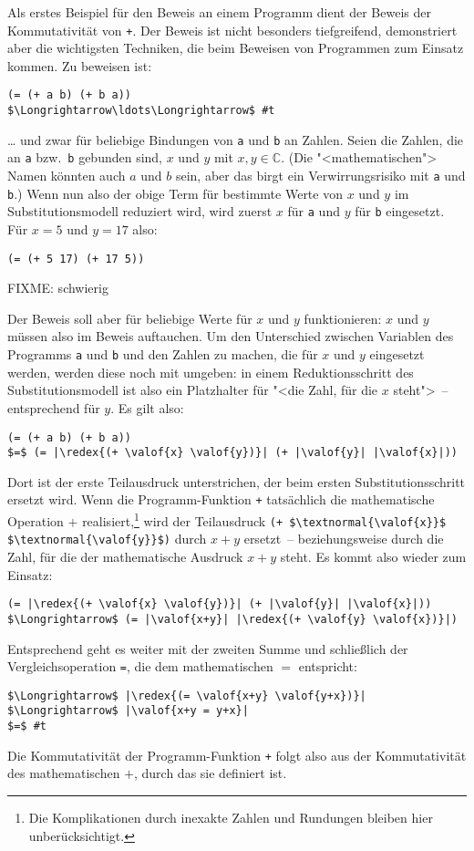 Als erstes Beispiel für den Beweis an einem Programm dient der Beweis
der Kommutativität von \lstinline{+}.  Der Beweis ist nicht besonders
tiefgreifend, demonstriert aber die wichtigsten Techniken, die beim
Beweisen von Programmen zum Einsatz kommen.  Zu beweisen ist:
%
\begin{lstlisting}
(= (+ a b) (+ b a))
$\Longrightarrow\ldots\Longrightarrow$ #t
\end{lstlisting}
%
\ldots{} und zwar für beliebige Bindungen von \lstinline{a} und
\lstinline{b} an Zahlen.  Seien die Zahlen, die an \lstinline{a} bzw.\
\lstinline{b} gebunden sind, $x$ und $y$ mit $x,y\in\mathbb{C}$.  (Die
"<mathematischen"> Namen könnten auch $a$ und $b$ sein, aber das birgt
ein Verwirrungsrisiko mit \lstinline{a} und \lstinline{b}.)  Wenn nun also
der obige Term für bestimmte Werte von $x$ und $y$ im
Substitutionsmodell reduziert wird, wird zuerst $x$ für \lstinline{a} und
$y$ für \lstinline{b} eingesetzt.  Für $x=5$ und $y=17$ also:
%
\begin{lstlisting}
(= (+ 5 17) (+ 17 5))
\end{lstlisting}
%
FIXME: \valof{\_} schwierig

Der Beweis soll aber für beliebige Werte für $x$ und $y$
funktionieren: $x$ und $y$ müssen also im Beweis auftauchen.
Um den Unterschied zwischen Variablen des Programms \lstinline{a} und
\lstinline{b} und den Zahlen zu machen, die für $x$ und $y$ eingesetzt
werden, werden diese noch mit \valof{\_} umgeben: \valof{x} in
einem Reduktionsschritt des Substitutionsmodell ist also ein
Platzhalter für "<die Zahl, für die $x$ steht">~-- entsprechend für $y$.
Es gilt also:

\begin{lstlisting}
(= (+ a b) (+ b a))
$=$ (= |\redex{(+ \valof{x} \valof{y})}| (+ |\valof{y}| |\valof{x}|))
\end{lstlisting}
%
Dort ist der erste Teilausdruck unterstrichen, der beim ersten
Substitutionsschritt ersetzt wird.  Wenn die Programm-Funktion
\lstinline{+} tatsächlich die mathematische Operation $+$
realisiert,\footnote{Die Komplikationen durch inexakte Zahlen und
  Rundungen bleiben hier unberücksichtigt.}
wird der Teilausdruck \lstinline[mathescape]!(+ $\textnormal{\valof{x}}$ $\textnormal{\valof{y}}$)! durch $x+y$
ersetzt~-- beziehungsweise durch die Zahl, für die der mathematische
Ausdruck $x+y$ steht.  Es kommt also wieder \valof{\_} zum Einsatz:
%
\begin{lstlisting}
(= |\redex{(+ \valof{x} \valof{y})}| (+ |\valof{y}| |\valof{x}|))
$\Longrightarrow$ (= |\valof{x+y}| |\redex{(+ \valof{y} \valof{x})}|)
\end{lstlisting}
%
Entsprechend geht es weiter mit der zweiten Summe und schließlich der
Vergleichsoperation \lstinline{=}, die dem mathematischen $=$ entspricht:
%
\begin{lstlisting}
$\Longrightarrow$ |\redex{(= \valof{x+y} \valof{y+x})}|
$\Longrightarrow$ |\valof{x+y = y+x}|
$=$ #t
\end{lstlisting}
%
Die Kommutativität der Programm-Funktion \lstinline{+} folgt also aus der
Kommutativität des mathematischen $+$, durch das sie definiert ist.

